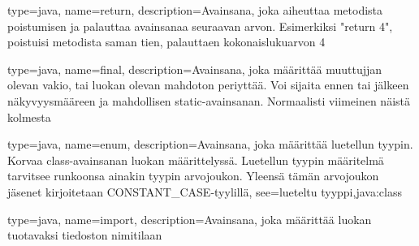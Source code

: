 {
	type=java,
	name=return,
	description={Avainsana, joka aiheuttaa metodista poistumisen ja palauttaa avainsanaa seuraavan
arvon. Esimerkiksi "return 4", poistuisi metodista saman tien, palauttaen kokonaislukuarvon 4}
}

{
	type=java,
	name=final,
	description={Avainsana, joka määrittää muuttujjan olevan vakio, tai luokan olevan mahdoton
periyttää. Voi sijaita ennen tai jälkeen näkyvyysmääreen ja mahdollisen static-avainsanan.
Normaalisti viimeinen näistä kolmesta}
}

{
	type=java,
	name=enum,
	description={Avainsana, joka määrittää luetellun tyypin. Korvaa class-avainsanan luokan
määrittelyssä. Luetellun tyypin määritelmä tarvitsee runkoonsa ainakin tyypin arvojoukon. Yleensä
tämän arvojoukon jäsenet kirjoitetaan CONSTANT\_CASE-tyylillä},
	see={lueteltu tyyppi,java:class}
}

{
	type=java,
	name=import,
	description={Avainsana, joka määrittää luokan tuotavaksi tiedoston nimitilaan}
}